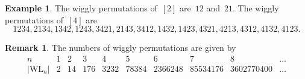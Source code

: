 \documentclass{amsart}
\theoremstyle{definition}
\newtheorem{example}[theorem]{Example}
\newtheorem{remark}[theorem]{Remark}
\newcommand{\wigglyLattice}{\mathrm{WL}} %
\begin{document}
\begin{example}
The wiggly permutations of~$[2]$ are~$12$ and~$21$.
The wiggly permutations of~$[4]$ are
\[
1234, 2134, 1342, 1243, 3421, 2143, 3412, 1432, 1423, 4321, 4213, 4312, 4132, 4123.
\]
\end{example}

\begin{remark}
The numbers of wiggly permutations are given by
\[
\begin{array}{c|ccccccccc}
n & 1 & 2 & 3 & 4 & 5 & 6 & 7 & 8 & \dots \\
\hline
|\wigglyLattice_n| & 2 & 14 & 176 & 3232 & 78384 & 2366248 & 85534176 & 3602770400 & \dots
\end{array}
\]
\end{remark}
\end{document}
